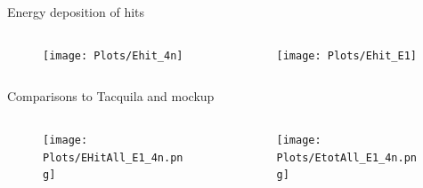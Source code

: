 \documentclass[compress, 13pt, aspectratio=169]{beamer}
\begin{document}
\begin{frame}{Energy deposition of hits}
    \vspace*{-0.6cm}
    \begin{columns}
        \begin{column}{0.5\textwidth}
            \begin{figure}[t]
                \texttt{[image: Plots/Ehit\_4n]}%
            \end{figure}
        \end{column}
        \begin{column}{0.5\textwidth}
            \begin{figure}[t]
                \texttt{[image: Plots/Ehit\_E1]}%
            \end{figure}
        \end{column}
    \end{columns}
\end{frame}

\begin{frame}{Comparisons to Tacquila and mockup}
    \vspace*{-0.6cm}
    \begin{columns}
        \begin{column}{0.5\textwidth}
            \begin{figure}[t]
                \texttt{[image: Plots/EHitAll\_E1\_4n.png]}%
            \end{figure}
        \end{column}
        \begin{column}{0.5\textwidth}
            \begin{figure}[t]
                \texttt{[image: Plots/EtotAll\_E1\_4n.png]}%
            \end{figure}
        \end{column}
    \end{columns}
\end{frame}
\end{document}
